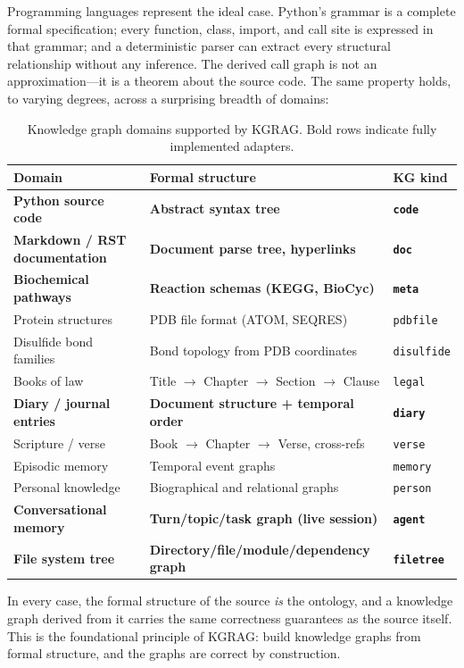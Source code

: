 \documentclass[10pt]{article}
\begin{document}
Programming languages represent the ideal case. Python's grammar is a complete
formal specification; every function, class, import, and call site is expressed
in that grammar; and a deterministic parser can extract every structural
relationship without any inference. The derived call graph is not an
approximation---it is a theorem about the source code. The same property holds,
to varying degrees, across a surprising breadth of domains:

\begin{table}[h]
\centering
\caption{Knowledge graph domains supported by KGRAG. Bold rows indicate fully implemented adapters.}
\label{tab:domains}
\begin{tabular}{lll}
\toprule
Domain & Formal structure & KG kind \\
\midrule
\textbf{Python source code} & \textbf{Abstract syntax tree} & \textbf{\texttt{code}} \\
\textbf{Markdown / RST documentation} & \textbf{Document parse tree, hyperlinks} & \textbf{\texttt{doc}} \\
\textbf{Biochemical pathways} & \textbf{Reaction schemas (KEGG, BioCyc)} & \textbf{\texttt{meta}} \\
Protein structures & PDB file format (ATOM, SEQRES) & \texttt{pdbfile} \\
Disulfide bond families & Bond topology from PDB coordinates & \texttt{disulfide} \\
Books of law & Title $\rightarrow$ Chapter $\rightarrow$ Section $\rightarrow$ Clause & \texttt{legal} \\
\textbf{Diary / journal entries} & \textbf{Document structure + temporal order} & \textbf{\texttt{diary}} \\
Scripture / verse & Book $\rightarrow$ Chapter $\rightarrow$ Verse, cross-refs & \texttt{verse} \\
Episodic memory & Temporal event graphs & \texttt{memory} \\
Personal knowledge & Biographical and relational graphs & \texttt{person} \\
\textbf{Conversational memory} & \textbf{Turn/topic/task graph (live session)} & \textbf{\texttt{agent}} \\
\textbf{File system tree} & \textbf{Directory/file/module/dependency graph} & \textbf{\texttt{filetree}} \\
\bottomrule
\end{tabular}
\end{table}

In every case, the formal structure of the source \emph{is} the ontology, and a
knowledge graph derived from it carries the same correctness guarantees as the
source itself. This is the foundational principle of KGRAG: build knowledge
graphs from formal structure, and the graphs are correct by construction.
\end{document}
